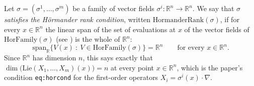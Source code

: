 \begin{definition}
Let $\sigma=(\sigma^1,\dots,\sigma^m)$ be a family of vector fields
$\sigma^i:\mathbb{R}^n\to\mathbb{R}^n$. We say that $\sigma$ \emph{satisfies the H\"ormander rank
condition}, written $\mathrm{HormanderRank}(\sigma)$, if for every $x\in\mathbb{R}^n$ the linear
span of the set of evaluations at $x$ of the vector fields of $\mathrm{HorFamily}(\sigma)$ (see
) is the whole of $\mathbb{R}^n$:
$$\mathrm{span}_{\mathbb{R}}\big\{V(x)\ :\ V\in\mathrm{HorFamily}(\sigma)\big\}=\mathbb{R}^n
\qquad\text{for every }x\in\mathbb{R}^n .$$
Since $\mathbb{R}^n$ has dimension $n$, this says exactly that
$\dim\big(\mathrm{Lie}(X_1,\dots,X_m)(x)\big)=n$ at every point $x\in\mathbb{R}^n$, which is the
paper's condition \texttt{eq:horcond} for the first-order operators
$X_i=\sigma^i(x)\cdot\nabla$.
\end{definition}
